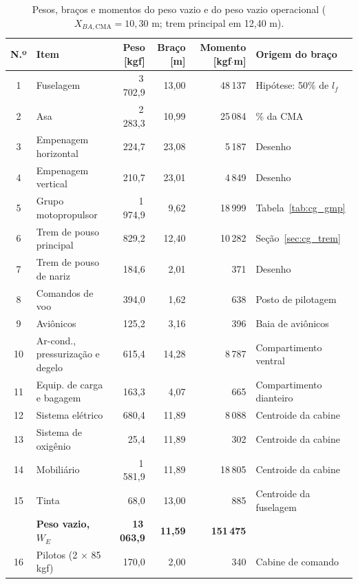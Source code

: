 \begin{table}[H]
  \centering
  \linespread{1}\small
  \setlength{\tabcolsep}{4pt}
  \caption{Pesos, braços e momentos do peso vazio e do peso vazio operacional ($X_{BA,\text{CMA}} = 10{,}30$ m; trem principal em 12,40 m).}
  \label{tab:cg_bracos}
  \begin{tabularx}{\textwidth}{c >{\raggedright\arraybackslash}X r r r >{\raggedright\arraybackslash}X}
    \toprule
    \textbf{N.º} & \textbf{Item} & \textbf{Peso [kgf]} & \textbf{Braço [m]} & \textbf{Momento [kgf$\cdot$m]} & \textbf{Origem do braço} \\
    \midrule
    1 & Fuselagem & 3\,702,9 & 13,00 & 48\,137 & Hipótese: 50\% de $l_f$ \\
    2 & Asa & 2\,283,3 & 10,99 & 25\,084 & 25\% da CMA \\
    3 & Empenagem horizontal & 224,7 & 23,08 & 5\,187 & Desenho \\
    4 & Empenagem vertical & 210,7 & 23,01 & 4\,849 & Desenho \\
    5 & Grupo motopropulsor & 1\,974,9 & 9,62 & 18\,999 & Tabela~\ref{tab:cg_gmp} \\
    6 & Trem de pouso principal & 829,2 & 12,40 & 10\,282 & Seção~\ref{sec:cg_trem} \\
    7 & Trem de pouso de nariz & 184,6 & 2,01 & 371 & Desenho \\
    8 & Comandos de voo & 394,0 & 1,62 & 638 & Posto de pilotagem \\
    9 & Aviônicos & 125,2 & 3,16 & 396 & Baia de aviônicos \\
    10 & Ar-cond., pressurização e degelo & 615,4 & 14,28 & 8\,787 & Compartimento ventral \\
    11 & Equip. de carga e bagagem & 163,3 & 4,07 & 665 & Compartimento dianteiro \\
    12 & Sistema elétrico & 680,4 & 11,89 & 8\,088 & Centroide da cabine \\
    13 & Sistema de oxigênio & 25,4 & 11,89 & 302 & Centroide da cabine \\
    14 & Mobiliário & 1\,581,9 & 11,89 & 18\,805 & Centroide da cabine \\
    15 & Tinta & 68,0 & 13,00 & 885 & Centroide da fuselagem \\
    \midrule
     & \textbf{Peso vazio, $W_E$} & \textbf{13\,063,9} & \textbf{11,59} & \textbf{151\,475} & \\
    \midrule
    16 & Pilotos (2 × 85 kgf) & 170,0 & 2,00 & 340 & Cabine de comando \\

\end{tabularx}
\end{table}
